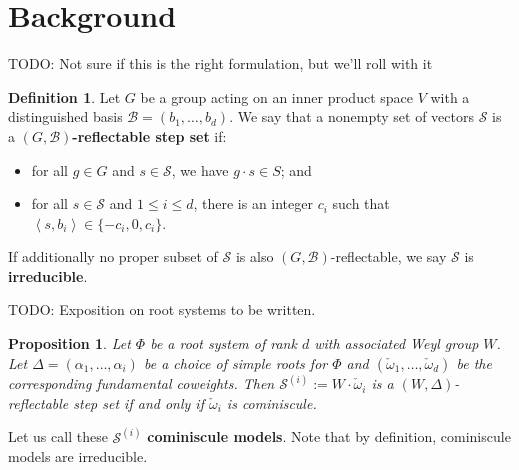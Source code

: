 \documentclass[A4,12pt]{article}
\newcommand{\<}{\left\langle}
\renewcommand{\>}{\right\rangle}
\newcommand{\coweight}{\check{\omega}}
\newcommand{\steps}{\mathcal{S}}
\newtheorem{proposition}[theorem]{Proposition}
\theoremstyle{definition}
\newtheorem*{definition}{Definition}
\theoremstyle{example}
\begin{document}
\section{Background}

TODO: Not sure if this is the right formulation, but we'll roll with it

\begin{definition}
Let $G$ be a group acting on an inner product space $V$ with a distinguished basis $\mathcal{B}=(b_1,\dots, b_d)$. We say that a nonempty set of vectors $\steps$ is a \textbf{$(G,\mathcal{B})$-reflectable step set} if:
\begin{itemize}
\item for all $g\in G$ and $s\in \steps$, we have $g\cdot s\in S$; and
\item for all $s\in \steps$ and $1\leq i\leq d$, there is an integer $c_i$ such that $\<s, b_i\>\in \{-c_i,0,c_i\}$.
\end{itemize}
If additionally no proper subset of $\steps$ is also $(G,\mathcal{B})$-reflectable, we say $\steps$ is \textbf{irreducible}.
\end{definition}

TODO: Exposition on root systems to be written.

\begin{proposition}
Let $\Phi$ be a root system of rank $d$ with associated Weyl group $W$. Let $\Delta=(\alpha_1,\dots,\alpha_i)$ be a choice of simple roots for $\Phi$ and $(\coweight_1,\dots,\coweight_d)$ be the corresponding fundamental coweights. Then $\steps^{(i)}:=W\cdot\coweight_i$ is a $(W,\Delta)$-reflectable step set if and only if $\coweight_i$ is cominiscule.
\end{proposition}

Let us call these $\steps^{(i)}$ \textbf{cominiscule models}. Note that by definition, cominiscule models are irreducible.
\end{document}

